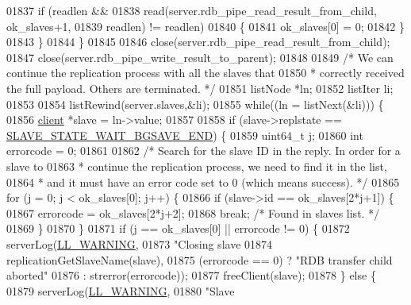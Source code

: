 \begin{DoxyCode}
{{{{{{{{{{{{{{{{{{{{{{{{{{{{{{{{{{{{01837             \textcolor{keywordflow}{if} (readlen &&
01838                 read(server.rdb\_pipe\_read\_result\_from\_child, ok\_slaves+1,
01839                      readlen) != readlen)
01840             \{
01841                 ok\_slaves[0] = 0;
01842             \}
01843         \}
01844     \}
01845 
01846     close(server.rdb\_pipe\_read\_result\_from\_child);
01847     close(server.rdb\_pipe\_write\_result\_to\_parent);
01848 
01849     \textcolor{comment}{/* We can continue the replication process with all the slaves that}
01850 \textcolor{comment}{     * correctly received the full payload. Others are terminated. */}
01851     listNode *ln;
01852     listIter li;
01853 
01854     listRewind(server.slaves,&li);
01855     \textcolor{keywordflow}{while}((ln = listNext(&li))) \{
01856         \hyperlink{structclient}{client} *slave = ln->value;
01857 
01858         \textcolor{keywordflow}{if} (slave->replstate == \hyperlink{server_8h_a2a1b586e8f326f831f6ab466c8c3f38a}{SLAVE\_STATE\_WAIT\_BGSAVE\_END}) \{
01859             uint64\_t j;
01860             \textcolor{keywordtype}{int} errorcode = 0;
01861 
01862             \textcolor{comment}{/* Search for the slave ID in the reply. In order for a slave to}
01863 \textcolor{comment}{             * continue the replication process, we need to find it in the list,}
01864 \textcolor{comment}{             * and it must have an error code set to 0 (which means success). */}
01865             \textcolor{keywordflow}{for} (j = 0; j < ok\_slaves[0]; j++) \{
01866                 \textcolor{keywordflow}{if} (slave->id == ok\_slaves[2*j+1]) \{
01867                     errorcode = ok\_slaves[2*j+2];
01868                     \textcolor{keywordflow}{break}; \textcolor{comment}{/* Found in slaves list. */}
01869                 \}
01870             \}
01871             \textcolor{keywordflow}{if} (j == ok\_slaves[0] || errorcode != 0) \{
01872                 serverLog(\hyperlink{server_8h_a31229b9334bba7d6be2a72970967a14b}{LL\_WARNING},
01873                 \textcolor{stringliteral}{"Closing slave %
01874                     replicationGetSlaveName(slave),
01875                     (errorcode == 0) ? \textcolor{stringliteral}{"RDB transfer child aborted"}
01876                                      : strerror(errorcode));
01877                 freeClient(slave);
01878             \} \textcolor{keywordflow}{else} \{
01879                 serverLog(\hyperlink{server_8h_a31229b9334bba7d6be2a72970967a14b}{LL\_WARNING},
01880                 \textcolor{stringliteral}{"Slave %
}}}}}}}}}}}}}}}}}}}}}}}}}}}}}}}}}}}}}}
\end{DoxyCode}
